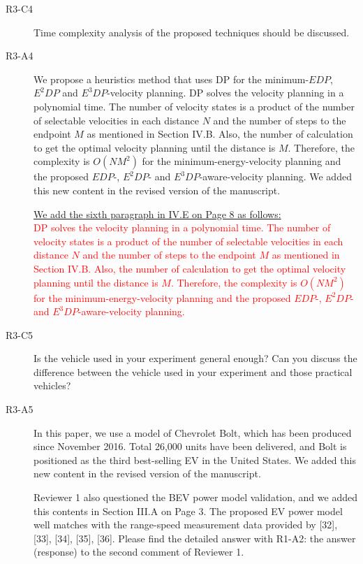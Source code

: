 \documentclass[onecolumn]{IEEEconf}
\begin{document}
\begin{description}
\item [R3-C4] Time complexity analysis of the proposed techniques should be discussed.

\item [R3-A4] We propose a heuristics method that uses DP for the minimum-$EDP$, $E^2DP$ and $E^3DP$-velocity planning. DP solves the velocity planning in a polynomial time. The number of velocity states is a product of the number of selectable velocities in each distance $N$ and the number of steps to the endpoint $M$ as mentioned in Section IV.B. Also, the number of calculation to get the optimal velocity planning until the distance is $M$. Therefore, the complexity is $O(NM^2)$ for the minimum-energy-velocity planning and the proposed $EDP$-, $E^2DP$- and $E^3DP$-aware-velocity planning. We added this new content in the revised version of the manuscript. 
 
\uline{We add the sixth paragraph in IV.E on Page 8 as follows:}\\
\textcolor{red}{DP solves the velocity planning in a polynomial time. The number of velocity states is a product of the number of selectable velocities in each distance $N$ and the number of steps to the endpoint $M$ as mentioned in Section IV.B. Also, the number of calculation to get the optimal velocity planning until the distance is $M$. Therefore, the complexity is $O(NM^2)$ for the minimum-energy-velocity planning and the proposed $EDP$-, $E^2DP$- and $E^3DP$-aware-velocity planning.} 

\item [R3-C5] Is the vehicle used in your experiment general enough? Can you discuss the difference between the vehicle used in your experiment and those practical vehicles?

\item [R3-A5] In this paper, we use a model of Chevrolet Bolt, which has been produced since November 2016. Total 26,000 units have been  delivered, and Bolt is positioned as the third best-selling EV in the United States. We added this new content in the revised version of the manuscript. 

Reviewer 1 also questioned the BEV power model validation, and we added this contents in Section III.A on Page 3. The proposed EV power model well matches with the range-speed measurement data provided by [32], [33], [34], [35], [36]. Please find the detailed answer with R1-A2: the answer (response) to the second comment of Reviewer 1. 


\end{description}
\end{document}
